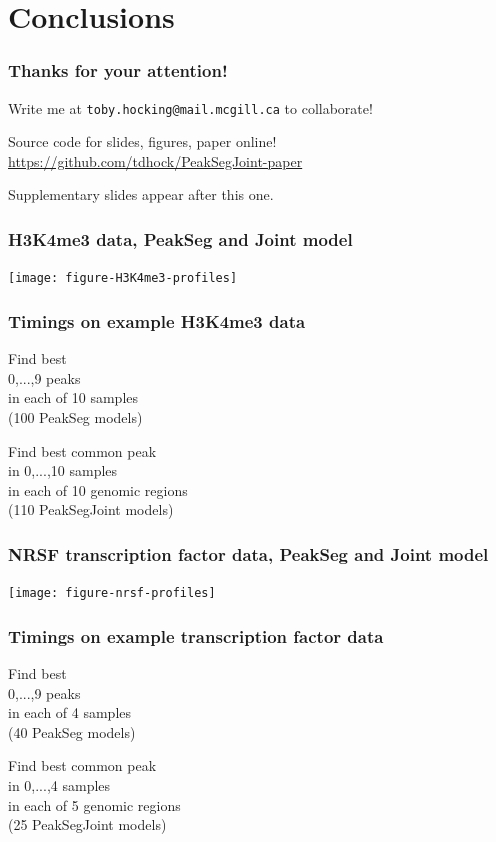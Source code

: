 \documentclass{beamer}
\begin{document}
\section{Conclusions}

\begin{frame}
  \frametitle{Thanks for your attention!}
  Write me at \alert{\texttt{toby.hocking@mail.mcgill.ca}} to collaborate!

  \vskip 1cm

  Source code for slides, figures, paper online!\\
  \small
  \url{https://github.com/tdhock/PeakSegJoint-paper}
  \vskip 1cm

  Supplementary slides appear after this one.

\end{frame}

\begin{frame}
  \frametitle{H3K4me3 data, PeakSeg and Joint model}

  \texttt{[image: figure-H3K4me3-profiles]}
\end{frame}

\begin{frame}
  \frametitle{Timings on example H3K4me3 data}

  \small

\parbox{1.5in}{
  Find best \\
  0,...,9 peaks\\
  in each of 10 samples\\
  (100 PeakSeg models)

  
}
\parbox{2in}{
  Find best common peak\\
  in 0,...,10 samples\\
  in each of 10 genomic regions\\
  (110 PeakSegJoint models)

  
}

\end{frame}

\begin{frame}
  \frametitle{NRSF transcription factor data, PeakSeg and Joint model}

  \texttt{[image: figure-nrsf-profiles]}
\end{frame}

\begin{frame}
  \frametitle{Timings on example transcription factor data}

  \scriptsize

  Find best \\
  0,...,9 peaks\\
  in each of 4 samples\\
  (40 PeakSeg models)

  

  \vskip 0.2cm

  Find best common peak\\
  in 0,...,4 samples\\
  in each of 5 genomic regions\\
  (25 PeakSegJoint models)

  

\end{frame}
\end{document}
